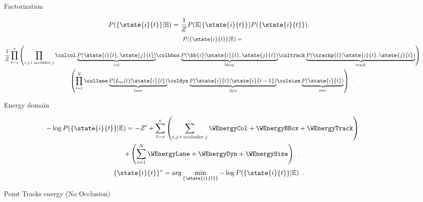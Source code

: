\begin{frame}{Factorization}

\begin{align*}
  P(\{\state{i}{t}\} | \mathbb{E}) =
  \frac{1}{Z}P( \mathbb{E} | \{\state{i}{t}\})P(\{\state{i}{t}\})&.
\end{align*}
\begin{multline*}
  P(\{\state{i}{t}\} | \mathbb{E}) = \\
  \frac{1}{Z}
  \prod_{t=s}^{e}
  \left(
    \prod_{i,j: i \text{ occludes } j}
    {\colcol\underbrace{P(\state{i}{t}, \state{j}{t})}_{\text{col}}}
    {\colbbox\underbrace{P(\bb{i} | \state{i}{t}, \state{j}{t})}_{\text{bbox}}}
    {\coltrack\underbrace{P(\trackp{t} | \state{i}{t}, \state{j}{t})}_{\text{track}}}
\right)
\\
\left(
  \prod_{i=1}^{N}
  {\collane\underbrace{P(L_m(t) | \state{i}{t})}_{\text{lane}}}
  {\coldyn\underbrace{P(\state{i}{t} | \state{i}{t-1})}_{\text{dyn}}}
  {\colsize\underbrace{P(\state{i}{t})}_{\text{size}}}
\right)
  \enspace .
\end{multline*}
%

\end{frame}


\begin{frame}{Energy domain}

\begin{multline*}
  \hspace{-1cm}
  -\log{P(\{\state{i}{t}\} | \mathbb{E})} = 
  -Z' 
  + \sum_{t=s}^{e}
  \left(
    \sum_{i,j:i \text{ occludes } j}   
  \WEnergyCol 
   + \WEnergyBBox
   + \WEnergyTrack
\right)
  \\
  + \left(
  \sum_{i=1}^N 
  \WEnergyLane
  + \WEnergyDyn
  + \WEnergySize
\right)
  \enspace.
\end{multline*}
\begin{align*}
  \{\state{i}{t}\}^* &= \arg \min_{\{\state{i}{t}\}} - \log P(\{\state{i}{t}\} | \mathbb{E})\enspace.
\end{align*}
  
\end{frame}

\begin{frame}{Point Tracks energy (No Occlusion)}
  \centering
  \begin{figure}
  
  \end{figure}
\end{frame}

